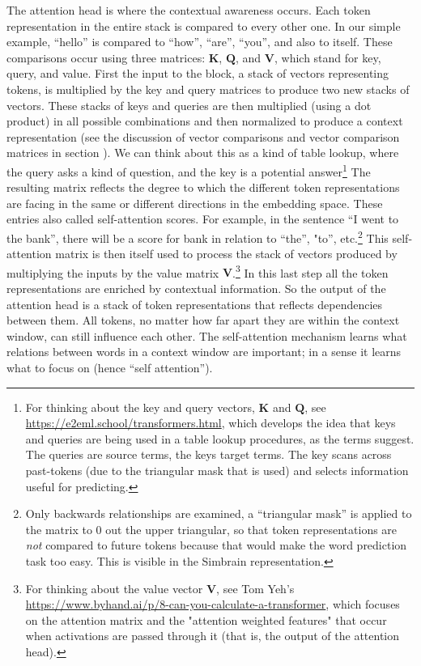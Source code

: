 The attention head is where the contextual awareness occurs. Each token
representation in the entire stack is compared to every other one. In our
simple example, ``hello'' is compared to ``how'', ``are'',  ``you'', and also
to itself. These comparisons occur using three matrices: $\textbf{K}$,
$\textbf{Q}$, and $\textbf{V}$, which stand for key, query, and value. First
the input to the block, a stack of vectors representing tokens, is multiplied
by the key and query matrices to produce two new stacks of vectors. These
stacks of keys and queries are then multiplied (using a dot product) in all
possible combinations and then normalized to produce a context representation
(see the discussion of vector comparisons and vector comparison matrices in
section ). We can think about this as a kind of
table lookup, where the query asks a kind of question, and the key is a
potential answer\footnote{For thinking about the key and query vectors,
$\textbf{K}$ and $\textbf{Q}$, see
\url{https://e2eml.school/transformers.html}, which develops the idea that keys
and queries are being used in a table lookup procedures, as the terms suggest.
The queries are source terms, the keys target terms. The key scans across
past-tokens (due to the triangular mask that is used) and selects information
useful for predicting.} The resulting matrix reflects the degree to which the
different token representations are facing in the same or different directions
in the embedding space. These entries also called self-attention scores. For
example, in the sentence ``I went to the bank'', there will be a score for bank
in relation to ``the'', "to'', etc.\footnote{Only backwards relationships are
examined, a ``triangular mask'' is applied to the matrix to 0 out the upper
triangular, so that token representations are \emph{not} compared to future
tokens because that would make the word prediction task too easy. This is
visible in the Simbrain representation.} This self-attention matrix is then
itself used to process the stack of vectors produced by multiplying the inputs
by the value matrix $\textbf{V}$.\footnote{For thinking about the value vector
$\textbf{V}$, see Tom Yeh's
\url{https://www.byhand.ai/p/8-can-you-calculate-a-transformer}, which focuses
on the attention matrix and the "attention weighted features" that occur when
activations are passed through it (that is, the output of the attention head).}
In this last step all the token representations are enriched by contextual
information. So the output of the attention head is a stack of token
representations that reflects dependencies between them. All tokens, no matter
how far apart they are within the context window, can still influence each
other. The self-attention mechanism learns what relations between words in a
context window are important; in a sense it learns what to focus on (hence
``self attention'').

